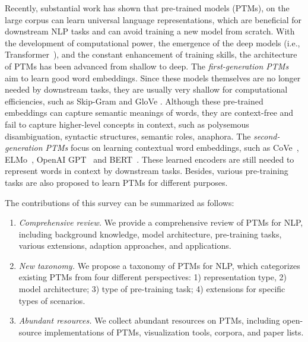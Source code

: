 \documentclass[fleqn]{SCYE-arxiv}
\begin{document}
\begin{multicols}{2}
Recently, substantial work has shown that pre-trained models (PTMs), on the large corpus can learn universal language representations, which are beneficial for downstream NLP tasks and can avoid training a new model from scratch. With the development of computational power, the emergence of the deep models (i.e., Transformer~\cite{vaswani2017transformer}), and the constant enhancement of training skills, the architecture of PTMs has been advanced from shallow to deep.
The \textit{first-generation PTMs} aim to learn good word embeddings. Since these models themselves are no longer needed by downstream tasks, they are usually very shallow for computational efficiencies, such as Skip-Gram \cite{mikolov2013word2vec} and GloVe \cite{DBLP:conf/emnlp/PenningtonSM14}. Although these pre-trained embeddings can capture semantic meanings of words, they are context-free and fail to capture higher-level concepts in context, such as polysemous disambiguation, syntactic structures, semantic roles, anaphora. The \textit{second-generation PTMs} focus on learning contextual word embeddings, such as CoVe~\cite{mccan2017learn}, ELMo~\cite{peters2018elmo}, OpenAI GPT~\cite{radford2018improving} and BERT~\cite{devlin2019bert}. These learned encoders are still needed to represent words in context by downstream tasks. Besides, various pre-training tasks are also proposed to learn PTMs for different purposes.


The contributions of this survey can be summarized as follows:
\begin{enumerate}
\item \textit{Comprehensive review.} We provide a comprehensive review of PTMs for NLP, including background knowledge, model architecture, pre-training tasks, various extensions, adaption approaches, and applications.

\item \textit{New taxonomy.} We propose a taxonomy of PTMs for NLP, which categorizes existing PTMs from four different perspectives: 1) representation type, 2) model architecture; 3) type of pre-training task; 4) extensions for specific types of scenarios.

\item \textit{Abundant resources.} We collect abundant resources on PTMs, including
    open-source implementations of PTMs, visualization tools, corpora, and paper lists.


\end{enumerate}
\end{multicols}
\end{document}
